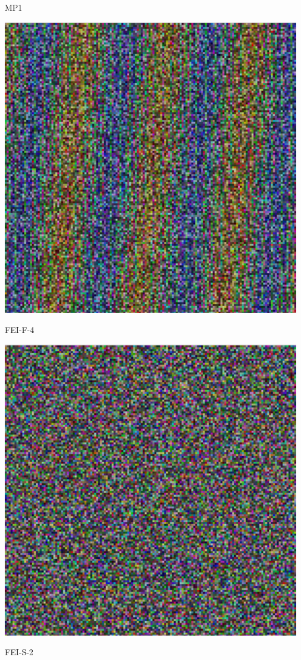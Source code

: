 \documentclass[
    aspectratio=169,
]{beamer}
\begin{document}
\begin{frame}[t,fragile]
\begin{minipage}[t]{0.65\textwidth}
\begin{minipage}[b]{0.25\textwidth}
             \par MP1
        \end{minipage}%
        \begin{minipage}[b]{0.25\textwidth}
            \centering
            \includegraphics[width=0.97\textwidth]{image/permutation-feif4.png}
            \par FEI-F-4
        \end{minipage}%
        \begin{minipage}[b]{0.25\textwidth}
            \centering
            \includegraphics[width=0.97\textwidth]{image/permutation-feis2.png}
            \par FEI-S-2
        \end{minipage}%
        

\end{minipage}
\end{frame}
\end{document}
